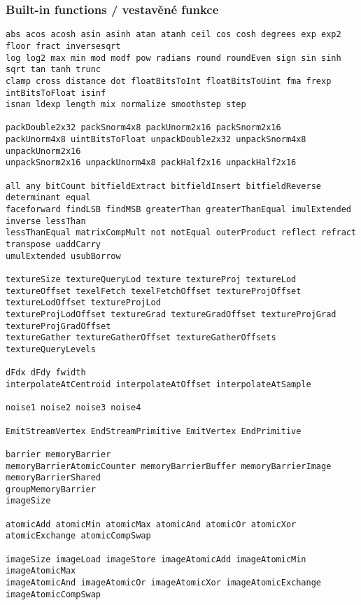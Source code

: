 \begin{frame}[fragile]\frametitle{Built-in functions / vestavěné funkce}\tiny
\begin{verbatim}
abs acos acosh asin asinh atan atanh ceil cos cosh degrees exp exp2 floor fract inversesqrt
log log2 max min mod modf pow radians round roundEven sign sin sinh sqrt tan tanh trunc
clamp cross distance dot floatBitsToInt floatBitsToUint fma frexp intBitsToFloat isinf
isnan ldexp length mix normalize smoothstep step

packDouble2x32 packSnorm4x8 packUnorm2x16 packSnorm2x16
packUnorm4x8 uintBitsToFloat unpackDouble2x32 unpackSnorm4x8 unpackUnorm2x16 
unpackSnorm2x16 unpackUnorm4x8 packHalf2x16 unpackHalf2x16

all any bitCount bitfieldExtract bitfieldInsert bitfieldReverse determinant equal
faceforward findLSB findMSB greaterThan greaterThanEqual imulExtended inverse lessThan
lessThanEqual matrixCompMult not notEqual outerProduct reflect refract transpose uaddCarry
umulExtended usubBorrow 

textureSize textureQueryLod texture textureProj textureLod 
textureOffset texelFetch texelFetchOffset textureProjOffset textureLodOffset textureProjLod 
textureProjLodOffset textureGrad textureGradOffset textureProjGrad textureProjGradOffset 
textureGather textureGatherOffset textureGatherOffsets textureQueryLevels

dFdx dFdy fwidth
interpolateAtCentroid interpolateAtOffset interpolateAtSample

noise1 noise2 noise3 noise4

EmitStreamVertex EndStreamPrimitive EmitVertex EndPrimitive

barrier memoryBarrier 
memoryBarrierAtomicCounter memoryBarrierBuffer memoryBarrierImage memoryBarrierShared 
groupMemoryBarrier
imageSize

atomicAdd atomicMin atomicMax atomicAnd atomicOr atomicXor atomicExchange atomicCompSwap

imageSize imageLoad imageStore imageAtomicAdd imageAtomicMin imageAtomicMax
imageAtomicAnd imageAtomicOr imageAtomicXor imageAtomicExchange imageAtomicCompSwap
\end{verbatim}
\end{frame}

